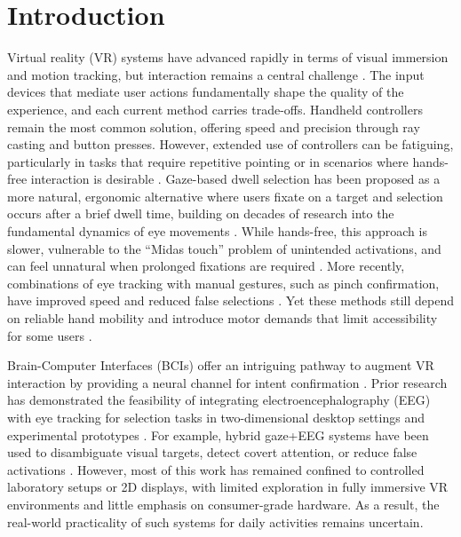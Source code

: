 \documentclass[utf8]{FrontiersinHarvard} %
\begin{document}
\section{Introduction}
Virtual reality (VR) systems have advanced rapidly in terms of visual immersion and motion tracking, but interaction remains a central challenge \citep{1011452,laviola2017book,101063}. The input devices that mediate user actions fundamentally shape the quality of the experience, and each current method carries trade-offs. Handheld controllers remain the most common solution, offering speed and precision through ray casting and button presses. However, extended use of controllers can be fatiguing, particularly in tasks that require repetitive pointing or in scenarios where hands-free interaction is desirable \citep{9419261}. Gaze-based dwell selection has been proposed as a more natural, ergonomic alternative \citep{9873986} where users fixate on a target and selection occurs after a brief dwell time, building on decades of research into the fundamental dynamics of eye movements \citep{101167,101001}. While hands-free, this approach is slower, vulnerable to the “Midas touch” problem \citep{Tang02062025} of unintended activations, and can feel unnatural when prolonged fixations are required \citep{8699248,isomoto,Chakraborty}. More recently, combinations of eye tracking with manual gestures, such as pinch confirmation, have improved speed and reduced false selections \citep{Zhang02072020,Vertegaal,Stellmach}. Yet these methods still depend on reliable hand mobility and introduce motor demands that limit accessibility for some users \citep{Gherman}.

Brain-Computer Interfaces (BCIs) offer an intriguing pathway to augment VR interaction by providing a neural channel for intent confirmation \citep{Saxena}. Prior research has demonstrated the feasibility of integrating electroencephalography (EEG) with eye tracking for selection tasks in two-dimensional desktop settings and experimental prototypes \citep{Putze,Putze2,Hild}. For example, hybrid gaze+EEG systems have been used to disambiguate visual targets, detect covert attention, or reduce false activations \citep{Shishkin,kalaganis2018erroraware,Vortmann,evain}. However, most of this work has remained confined to controlled laboratory setups or 2D displays, with limited exploration in fully immersive VR environments \citep{larsen2024synchronized} and little emphasis on consumer-grade hardware. As a result, the real-world practicality of such systems for daily activities remains uncertain.
\end{document}
